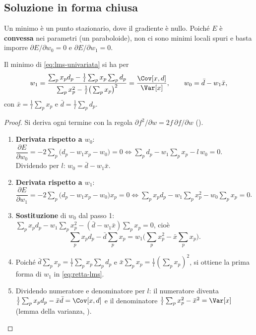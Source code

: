 \subsection{Soluzione in forma chiusa}

Un minimo è un punto stazionario, dove il gradiente è nullo. Poiché $E$ è \textbf{convessa} nei parametri (un
paraboloide), non ci sono minimi locali spuri e basta imporre
$\partial E/\partial w_0 = 0$ e $\partial E/\partial w_1 = 0$.

\begin{teorema}
Il minimo di \eqref{eq:lms-univariata} si ha per
\begin{equation}\label{eq:retta-lms}
w_1 = \frac{\sum_p x_pd_p - \frac1l\sum_p x_p\sum_p d_p}{\sum_p x_p^2 - \frac1l\big(\sum_p x_p\big)^2}
= \frac{\Cov[x,d]}{\Var[x]}, \qquad w_0 = \bar d - w_1\bar x ,
\end{equation}
con $\bar x = \frac1l\sum_p x_p$ e $\bar d = \frac1l\sum_pd_p$.
\end{teorema}
\begin{proof}
Si deriva ogni termine con la regola $\partial f^2/\partial w = 2f\,\partial f/\partial w$
().
\begin{enumerate}
  \item \textbf{Derivata rispetto a $w_0$}: $\dfrac{\partial E}{\partial w_0} = -2\sum_p\big(d_p - w_1x_p-w_0\big)
        = 0 \iff \sum_pd_p - w_1\sum_px_p - l\,w_0 = 0$. Dividendo per $l$:
        $\boxed{w_0 = \bar d - w_1\bar x}$.
  \item \textbf{Derivata rispetto a $w_1$}: $\dfrac{\partial E}{\partial w_1} = -2\sum_p\big(d_p - w_1x_p-w_0\big)x_p
        = 0 \iff \sum_px_pd_p - w_1\sum_px_p^2 - w_0\sum_px_p = 0$.
  \item \textbf{Sostituzione} di $w_0$ dal passo 1:
        $\sum_px_pd_p - w_1\sum_px_p^2 - (\bar d - w_1\bar x)\sum_px_p = 0$, cioè
        \[
        \sum_px_pd_p - \bar d\sum_px_p = w_1\Big(\sum_px_p^2 - \bar x\sum_px_p\Big).
        \]
  \item Poiché $\bar d\sum_px_p = \frac1l\sum_px_p\sum_pd_p$ e $\bar x\sum_px_p = \frac1l(\sum_px_p)^2$, si ottiene
        la prima forma di $w_1$ in \eqref{eq:retta-lms}.
  \item Dividendo numeratore e denominatore per $l$: il numeratore diventa
        $\frac1l\sum_px_pd_p - \bar x\bar d = \Cov[x,d]$ e il denominatore $\frac1l\sum_px_p^2-\bar x^2 = \Var[x]$
        (lemma della varianza, ). \qedhere
\end{enumerate}
\end{proof}

